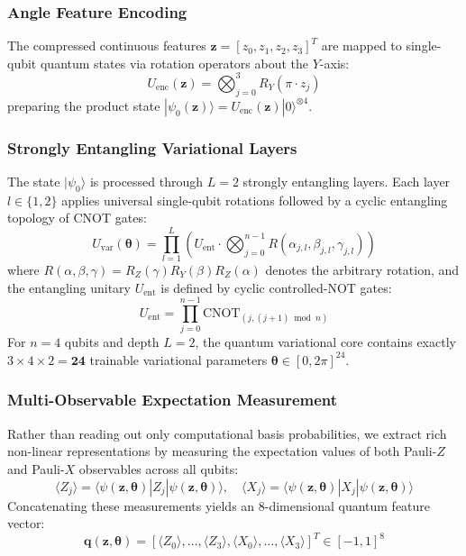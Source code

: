 \documentclass[conference]{IEEEtran}
\begin{document}
\subsubsection{Angle Feature Encoding}
The compressed continuous features $\mathbf{z} = [z_0, z_1, z_2, z_3]^T$ are mapped to single-qubit quantum states via rotation operators about the $Y$-axis:
\begin{equation}
    U_{\text{enc}}(\mathbf{z}) = \bigotimes_{j=0}^3 R_Y\left(\pi \cdot z_j\right)
\end{equation}
preparing the product state $|\psi_0(\mathbf{z})\rangle = U_{\text{enc}}(\mathbf{z}) |0\rangle^{\otimes 4}$.

\subsubsection{Strongly Entangling Variational Layers}
The state $|\psi_0\rangle$ is processed through $L = 2$ strongly entangling layers. Each layer $l \in \{1, 2\}$ applies universal single-qubit rotations followed by a cyclic entangling topology of CNOT gates:
\begin{equation}
    U_{\text{var}}(\boldsymbol{\theta}) = \prod_{l=1}^L \left( U_{\text{ent}} \cdot \bigotimes_{j=0}^{n-1} R(\alpha_{j,l}, \beta_{j,l}, \gamma_{j,l}) \right)
\end{equation}
where $R(\alpha, \beta, \gamma) = R_Z(\gamma) R_Y(\beta) R_Z(\alpha)$ denotes the arbitrary rotation, and the entangling unitary $U_{\text{ent}}$ is defined by cyclic controlled-NOT gates:
\begin{equation}
    U_{\text{ent}} = \prod_{j=0}^{n-1} \text{CNOT}_{(j, (j+1) \bmod n)}
\end{equation}
For $n = 4$ qubits and depth $L = 2$, the quantum variational core contains exactly $3 \times 4 \times 2 = \mathbf{24}$ trainable variational parameters $\boldsymbol{\theta} \in [0, 2\pi]^{24}$.

\subsubsection{Multi-Observable Expectation Measurement}
Rather than reading out only computational basis probabilities, we extract rich non-linear representations by measuring the expectation values of both Pauli-$Z$ and Pauli-$X$ observables across all qubits:
\begin{equation}
    \langle Z_j \rangle = \langle \psi(\mathbf{z}, \boldsymbol{\theta}) | Z_j | \psi(\mathbf{z}, \boldsymbol{\theta}) \rangle, \quad
    \langle X_j \rangle = \langle \psi(\mathbf{z}, \boldsymbol{\theta}) | X_j | \psi(\mathbf{z}, \boldsymbol{\theta}) \rangle
\end{equation}
Concatenating these measurements yields an 8-dimensional quantum feature vector:
\begin{equation}
    \mathbf{q}(\mathbf{z}, \boldsymbol{\theta}) = \left[ \langle Z_0 \rangle, \dots, \langle Z_3 \rangle, \langle X_0 \rangle, \dots, \langle X_3 \rangle \right]^T \in [-1, 1]^8
\end{equation}
\end{document}
